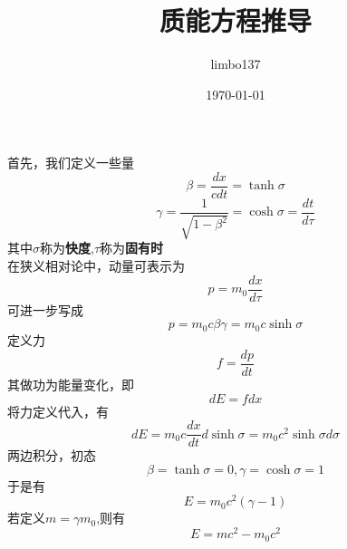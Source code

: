 \documentclass[utf8]{ctexart}
\title{质能方程推导}
\author{limbo137}
\date{\today}
\begin{document}
\maketitle
首先，我们定义一些量\[\beta=\frac{dx}{cdt}=\tanh{\sigma}\]
\[\gamma=\frac{1}{\sqrt{1-\beta^2}}=\cosh{\sigma}=\frac{dt}{d\tau}\]
其中$\sigma$称为\textbf{快度},$\tau$称为\textbf{固有时}
\\在狭义相对论中，动量可表示为\[p=m_0\frac{dx}{d\tau}\]
可进一步写成\[p=m_0c\beta\gamma=m_0c\sinh{\sigma}\]
定义力\[f=\frac{dp}{dt}\]
其做功为能量变化，即\[dE=fdx\]
将力定义代入，有\[dE=m_0c\frac{dx}{dt}d\sinh{\sigma}=m_0c^2\sinh{\sigma}d\sigma\]
两边积分，初态\[\beta=\tanh{\sigma}=0,\gamma=\cosh{\sigma}=1\]于是有\[E=m_0c^2(\gamma-1)\]
若定义$m=\gamma m_0$,则有\[E=mc^2-m_0c^2\]
\end{document}
